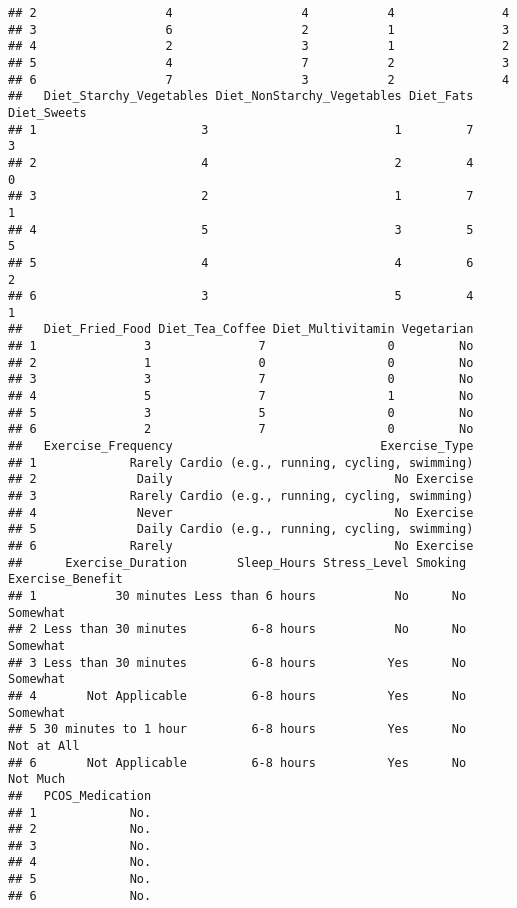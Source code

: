 \documentclass[
]{article}
\begin{document}
\begin{verbatim}
## 2                  4                  4           4               4
## 3                  6                  2           1               3
## 4                  2                  3           1               2
## 5                  4                  7           2               3
## 6                  7                  3           2               4
##   Diet_Starchy_Vegetables Diet_NonStarchy_Vegetables Diet_Fats Diet_Sweets
## 1                       3                          1         7           3
## 2                       4                          2         4           0
## 3                       2                          1         7           1
## 4                       5                          3         5           5
## 5                       4                          4         6           2
## 6                       3                          5         4           1
##   Diet_Fried_Food Diet_Tea_Coffee Diet_Multivitamin Vegetarian
## 1               3               7                 0         No
## 2               1               0                 0         No
## 3               3               7                 0         No
## 4               5               7                 1         No
## 5               3               5                 0         No
## 6               2               7                 0         No
##   Exercise_Frequency                             Exercise_Type
## 1             Rarely Cardio (e.g., running, cycling, swimming)
## 2              Daily                               No Exercise
## 3             Rarely Cardio (e.g., running, cycling, swimming)
## 4              Never                               No Exercise
## 5              Daily Cardio (e.g., running, cycling, swimming)
## 6             Rarely                               No Exercise
##      Exercise_Duration       Sleep_Hours Stress_Level Smoking Exercise_Benefit
## 1           30 minutes Less than 6 hours           No      No         Somewhat
## 2 Less than 30 minutes         6-8 hours           No      No         Somewhat
## 3 Less than 30 minutes         6-8 hours          Yes      No         Somewhat
## 4       Not Applicable         6-8 hours          Yes      No         Somewhat
## 5 30 minutes to 1 hour         6-8 hours          Yes      No       Not at All
## 6       Not Applicable         6-8 hours          Yes      No         Not Much
##   PCOS_Medication
## 1             No.
## 2             No.
## 3             No.
## 4             No.
## 5             No.
## 6             No.
\end{verbatim}
\end{document}
